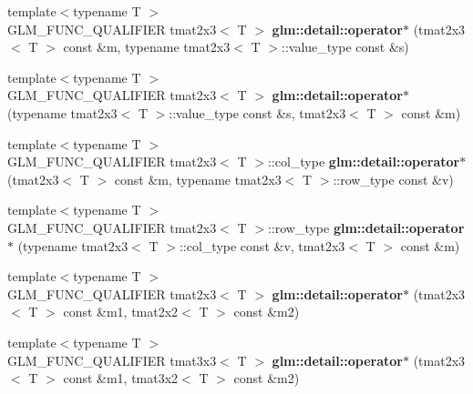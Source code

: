 \begin{DoxyCompactItemize}
\item 
\hypertarget{namespaceglm_1_1detail_a692e2df3516c96bec24a573b97d19ce7}{}{\footnotesize template$<$typename T $>$ }\\G\+L\+M\+\_\+\+F\+U\+N\+C\+\_\+\+Q\+U\+A\+L\+I\+F\+I\+E\+R tmat2x3$<$ T $>$ {\bfseries glm\+::detail\+::operator$\ast$} (tmat2x3$<$ T $>$ const \&m, typename tmat2x3$<$ T $>$\+::value\+\_\+type const \&s)\label{namespaceglm_1_1detail_a692e2df3516c96bec24a573b97d19ce7}

\item 
\hypertarget{namespaceglm_1_1detail_a627e509d125f3a9a29a68e5c60efb362}{}{\footnotesize template$<$typename T $>$ }\\G\+L\+M\+\_\+\+F\+U\+N\+C\+\_\+\+Q\+U\+A\+L\+I\+F\+I\+E\+R tmat2x3$<$ T $>$ {\bfseries glm\+::detail\+::operator$\ast$} (typename tmat2x3$<$ T $>$\+::value\+\_\+type const \&s, tmat2x3$<$ T $>$ const \&m)\label{namespaceglm_1_1detail_a627e509d125f3a9a29a68e5c60efb362}

\item 
\hypertarget{namespaceglm_1_1detail_a65b32cbf66eb420c4c891b0d10d64cd7}{}{\footnotesize template$<$typename T $>$ }\\G\+L\+M\+\_\+\+F\+U\+N\+C\+\_\+\+Q\+U\+A\+L\+I\+F\+I\+E\+R tmat2x3$<$ T $>$\+::col\+\_\+type {\bfseries glm\+::detail\+::operator$\ast$} (tmat2x3$<$ T $>$ const \&m, typename tmat2x3$<$ T $>$\+::row\+\_\+type const \&v)\label{namespaceglm_1_1detail_a65b32cbf66eb420c4c891b0d10d64cd7}

\item 
\hypertarget{namespaceglm_1_1detail_abc7fcb10389c59b1218f02eb32f52361}{}{\footnotesize template$<$typename T $>$ }\\G\+L\+M\+\_\+\+F\+U\+N\+C\+\_\+\+Q\+U\+A\+L\+I\+F\+I\+E\+R tmat2x3$<$ T $>$\+::row\+\_\+type {\bfseries glm\+::detail\+::operator$\ast$} (typename tmat2x3$<$ T $>$\+::col\+\_\+type const \&v, tmat2x3$<$ T $>$ const \&m)\label{namespaceglm_1_1detail_abc7fcb10389c59b1218f02eb32f52361}

\item 
\hypertarget{namespaceglm_1_1detail_a5fc83287be590de2728efc949f0b1725}{}{\footnotesize template$<$typename T $>$ }\\G\+L\+M\+\_\+\+F\+U\+N\+C\+\_\+\+Q\+U\+A\+L\+I\+F\+I\+E\+R tmat2x3$<$ T $>$ {\bfseries glm\+::detail\+::operator$\ast$} (tmat2x3$<$ T $>$ const \&m1, tmat2x2$<$ T $>$ const \&m2)\label{namespaceglm_1_1detail_a5fc83287be590de2728efc949f0b1725}

\item 
\hypertarget{namespaceglm_1_1detail_adb83cc2e3f78294af7e5cc32fafa42e6}{}{\footnotesize template$<$typename T $>$ }\\G\+L\+M\+\_\+\+F\+U\+N\+C\+\_\+\+Q\+U\+A\+L\+I\+F\+I\+E\+R tmat3x3$<$ T $>$ {\bfseries glm\+::detail\+::operator$\ast$} (tmat2x3$<$ T $>$ const \&m1, tmat3x2$<$ T $>$ const \&m2)\label{namespaceglm_1_1detail_adb83cc2e3f78294af7e5cc32fafa42e6}


\end{DoxyCompactItemize}
